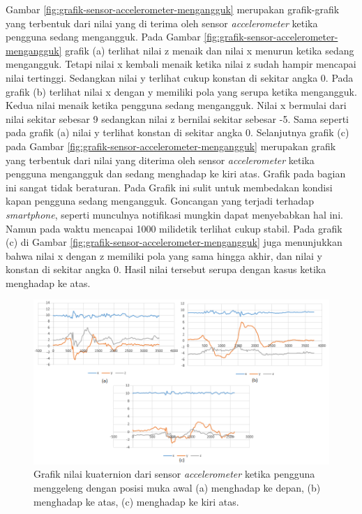 \documentclass[a4paper,twoside]{article}
\begin{document}
\begin{enumerate}
Gambar \ref{fig:grafik-sensor-accelerometer-mengangguk} merupakan grafik-grafik yang terbentuk dari nilai yang di terima oleh sensor \textit{accelerometer} ketika pengguna sedang mengangguk. Pada Gambar \ref{fig:grafik-sensor-accelerometer-mengangguk} grafik (a) terlihat nilai z menaik dan nilai x menurun ketika sedang mengangguk. Tetapi nilai x kembali menaik ketika nilai z sudah hampir mencapai nilai tertinggi. Sedangkan nilai y terlihat cukup konstan di sekitar angka 0. Pada grafik (b) terlihat nilai x dengan y memiliki pola yang serupa ketika mengangguk. Kedua nilai menaik ketika pengguna sedang mengangguk. Nilai x bermulai dari nilai sekitar sebesar 9 sedangkan nilai z bernilai sekitar sebesar -5. Sama seperti pada grafik (a) nilai y terlihat konstan di sekitar angka 0. Selanjutnya grafik (c) pada Gambar \ref{fig:grafik-sensor-accelerometer-mengangguk} merupakan grafik yang terbentuk dari nilai yang diterima oleh sensor \textit{accelerometer} ketika pengguna mengangguk dan sedang menghadap ke kiri atas. Grafik pada bagian ini sangat tidak beraturan. Pada Grafik ini sulit untuk membedakan kondisi kapan pengguna sedang mengangguk. Goncangan yang terjadi terhadap \textit{smartphone}, seperti munculnya notifikasi mungkin dapat menyebabkan hal ini. Namun pada waktu mencapai 1000 milidetik terlihat cukup stabil. Pada grafik (c) di Gambar \ref{fig:grafik-sensor-accelerometer-mengangguk} juga menunjukkan bahwa nilai x dengan z memiliki pola yang sama hingga akhir, dan nilai y konstan di sekitar angka 0. Hasil nilai tersebut serupa dengan kasus ketika menghadap ke atas. 


\begin{figure}[htbp]
\centering
\includegraphics[scale=0.6]{Gambar/grafik-sensor-accelerometer-menggeleng.png}
\caption{Grafik nilai kuaternion dari sensor \textit{accelerometer} ketika pengguna menggeleng dengan posisi muka awal (a) menghadap ke depan, (b) menghadap ke atas, (c) menghadap ke kiri atas.} 
\label{fig:grafik-sensor-accelerometer-menggeleng}
\end{figure}


\end{enumerate}
\end{document}
